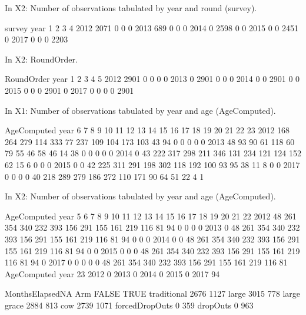 In \textsf{X2}: Number of observations tabulated by year and round (\textsf{survey}).
\begin{Schunk}
\begin{Soutput}
      survey
year      1    2    3    4
  2012 2071    0    0    0
  2013  689    0    0    0
  2014    0 2598    0    0
  2015    0    0 2451    0
  2017    0    0    0 2203
\end{Soutput}
\end{Schunk}
In \textsf{X2}: RoundOrder.
\begin{Schunk}
\begin{Soutput}
      RoundOrder
year      1    2    3    4    5
  2012 2901    0    0    0    0
  2013    0 2901    0    0    0
  2014    0    0 2901    0    0
  2015    0    0    0 2901    0
  2017    0    0    0    0 2901
\end{Soutput}
\end{Schunk}
In \textsf{X1}: Number of observations tabulated by year and age (\textsf{AgeComputed}).
\begin{Schunk}
\begin{Soutput}
      AgeComputed
year     6   7   8   9  10  11  12  13  14  15  16  17  18  19  20  21  22  23
  2012 168 264 279 114 333  77 237 109 104 173 103  43  94   0   0   0   0   0
  2013  48  93  90  61 118  60  79  55  46  58  46  14  38   0   0   0   0   0
  2014   0  43 222 317 298 211 346 131 234 121 124 152  62  15   6   0   0   0
  2015   0   0  42 225 311 291 198 302 118 192 100  93  95  38  11   8   0   0
  2017   0   0   0   0  40 218 289 279 186 272 110 171  90  64  51  22   4   1
\end{Soutput}
\end{Schunk}
In \textsf{X2}: Number of observations tabulated by year and age (\textsf{AgeComputed}).
\begin{Schunk}
\begin{Soutput}
      AgeComputed
year     5   6   7   8   9  10  11  12  13  14  15  16  17  18  19  20  21  22
  2012  48 261 354 340 232 393 156 291 155 161 219 116  81  94   0   0   0   0
  2013   0  48 261 354 340 232 393 156 291 155 161 219 116  81  94   0   0   0
  2014   0   0  48 261 354 340 232 393 156 291 155 161 219 116  81  94   0   0
  2015   0   0   0  48 261 354 340 232 393 156 291 155 161 219 116  81  94   0
  2017   0   0   0   0   0  48 261 354 340 232 393 156 291 155 161 219 116  81
      AgeComputed
year    23
  2012   0
  2013   0
  2014   0
  2015   0
  2017  94
\end{Soutput}
\end{Schunk}
\begin{Schunk}
\begin{Soutput}
                MonthsElapsedNA
Arm              FALSE TRUE
  traditional     2676 1127
  large           3015  778
  large grace     2884  813
  cow             2739 1071
  forcedDropOuts     0  359
  dropOuts           0  963
\end{Soutput}
\end{Schunk}

